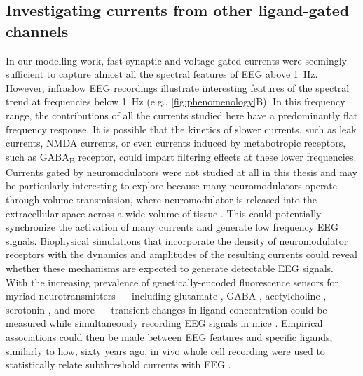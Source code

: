 \subsection{Investigating currents from other ligand-gated channels}
In our modelling work, fast synaptic and voltage-gated currents were seemingly sufficient to capture almost all the spectral features of EEG above \qty{1}{\hertz}. However, infraslow EEG recordings illustrate interesting features of the spectral trend at frequencies below \qty{1}{\hertz} (e.g., \autoref{fig:phenomenology}B). In this frequency range, the contributions of all the currents studied here have a predominantly flat frequency response. It is possible that the kinetics of slower currents, such as leak currents, NMDA currents, or even currents induced by metabotropic receptors, such as GABA\textsubscript{B} receptor, could impart filtering effects at these lower frequencies. Currents gated by neuromodulators were not studied at all in this thesis and may be particularly interesting to explore because many neuromodulators operate through volume transmission, where neuromodulator is released into the extracellular space across a wide volume of tissue \cite{Ozcete2024}. This could potentially synchronize the activation of many currents and generate low frequency EEG signals. Biophysical simulations that incorporate the density of neuromodulator receptors with the dynamics and amplitudes of the resulting currents could reveal whether these mechanisms are expected to generate detectable EEG signals. With the increasing prevalence of genetically-encoded fluorescence sensors for myriad neurotransmitters --- including glutamate \cite{Marvin2013}, GABA \cite{Marvin2019}, acetylcholine \cite{Jing2018}, serotonin \cite{Wan2021}, and more --- transient changes in ligand concentration could be measured while simultaneously recording EEG signals in mice \cite{Kim2024,Teng2023}. Empirical associations could then be made between EEG features and specific ligands, similarly to how, sixty years ago, in vivo whole cell recording were used to statistically relate subthreshold currents with EEG \cite{KLEE1965}.

